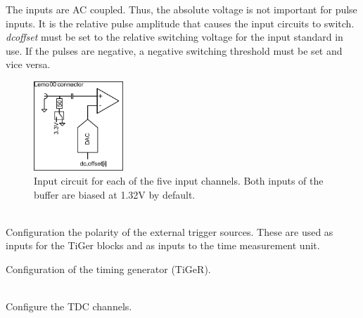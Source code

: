 			 \noindent The inputs are AC coupled. Thus, the absolute voltage is not important for pulse inputs. It is the relative pulse amplitude that causes the input circuits to switch. \textit{dc\tu offset} must be set to the relative switching voltage for the input standard in use. If the pulses are negative, a negative switching threshold must be set and vice versa.
			\begin{figure}
				\begin{center}
					\includegraphics[width=0.3\textwidth]{figures/InputCircuit.pdf}
					\caption{Input circuit for each of the five input channels. Both inputs of the buffer are biased at 1.32V by default.\label{fig:dcoffset1}}
				\end{center}
			\end{figure}

			\\
			Configuration the polarity of the external trigger sources.
			These are used as inputs for the TiGer blocks and as inputs to the time measurement unit.\par

			Configuration of the timing generator (TiGeR).

			\\
				Configure the TDC channels.

